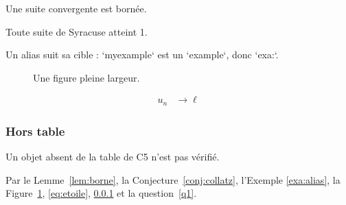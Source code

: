 \begin{lemma}[label=lem:borne]
  Une suite convergente est bornée.
\end{lemma}

\begin{conjecture}[label=conj:collatz]
  Toute suite de Syracuse atteint 1.
\end{conjecture}

\begin{myexample}[label=exa:alias]
  Un alias suit sa cible : `myexample` est un `example`, donc `exa:`.
\end{myexample}

\begin{figure}[ht!]
  \caption{Une figure pleine largeur.}\label{fig:large}
\end{figure}

\begin{align*}
  u_n &\to \ell \tag{$\star$}\label{eq:etoile}
\end{align*}

\subsubsection{Hors table}\label{detail}

\begin{question}\label{q1}
  Un objet absent de la table de C5 n'est pas vérifié.
\end{question}

Par le Lemme~\ref{lem:borne}, la Conjecture~\ref{conj:collatz}, l'Exemple
\ref{exa:alias}, la Figure~\ref{fig:large}, \eqref{eq:etoile}, \ref{detail}
et la question~\ref{q1}.
